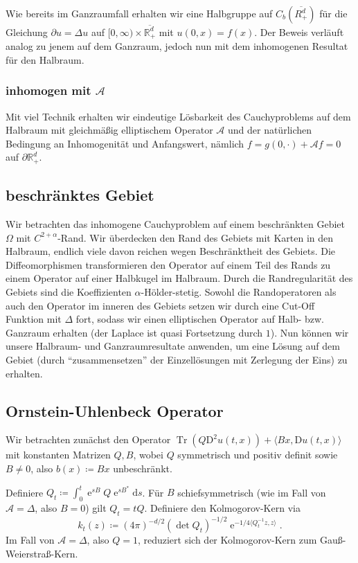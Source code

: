 \documentclass[11pt,a4paper]{scrartcl}
\newcommand{\R}{\mathbb{R}} %
\newcommand{\A}{\mathcal{A}}
\theoremstyle{plain}
\theoremstyle{definition}
\theoremstyle{remark}
\DeclareMathOperator{\Tr}{Tr}
\DeclareMathOperator{\e}{e}
\begin{document}
Wie bereits im Ganzraumfall erhalten wir eine Halbgruppe auf $C_b(\overline{R^d_+})$ für die Gleichung $\partial u = \Delta u$ auf $[0,\infty) \times \overline{\R^d_+}$ mit $u(0,x)=f(x)$. Der Beweis verläuft analog zu jenem auf dem Ganzraum, jedoch nun mit dem inhomogenen Resultat für den Halbraum.

\subsubsection{inhomogen mit $\A$}

Mit viel Technik erhalten wir eindeutige Lösbarkeit des Cauchyproblems auf dem Halbraum mit gleichmäßig elliptischem Operator $\A$ und der natürlichen Bedingung an Inhomogenität und Anfangswert, nämlich $f=g(0,\cdot) + \A f=0$ auf $\partial \R^d_+$.

\subsection{beschränktes Gebiet}

Wir betrachten das inhomogene Cauchyproblem auf einem beschränkten Gebiet $\Omega$ mit $C^{2+\alpha}$-Rand. Wir überdecken den Rand des Gebiets mit Karten in den Halbraum, endlich viele davon reichen wegen Beschränktheit des Gebiets. Die Diffeomorphismen transformieren den Operator auf einem Teil des Rands zu einem Operator auf einer Halbkugel im Halbraum. Durch die Randregularität des Gebiets sind die Koeffizienten $\alpha$-Hölder-stetig. Sowohl die Randoperatoren als auch den Operator im inneren des Gebiets setzen wir durch eine Cut-Off Funktion mit $\Delta$ fort, sodass wir einen elliptischen Operator auf Halb- bzw. Ganzraum erhalten (der Laplace ist quasi Fortsetzung durch $1$). Nun können wir unsere Halbraum- und Ganzraumresultate anwenden, um eine Lösung auf dem Gebiet (durch \enquote{zusammensetzen} der Einzellösungen mit Zerlegung der Eins) zu erhalten.

\subsection{Ornstein-Uhlenbeck Operator}

Wir betrachten zunächst den Operator $\Tr(Q\mathrm{D}^2 u(t,x))+\langle Bx, \mathrm{D}u(t,x)\rangle$ mit konstanten Matrizen $Q,B$, wobei $Q$ symmetrisch und positiv definit sowie $B\neq 0$, also $b(x)\coloneqq Bx$ unbeschränkt.

Definiere $Q_t\coloneqq \int_0^t \e^{sB}Q\e^{sB^*}\mathrm{d}s$. Für $B$ schiefsymmetrisch (wie im Fall von $\A=\Delta$, also $B=0$) gilt $Q_t=tQ$. Definiere den Kolmogorov-Kern via $$k_t(z)\coloneqq (4\pi)^{-d/2}(\det Q_t)^{-1/2} \e^{-1/4\langle Q_t^{-1}z, z\rangle}.$$ Im Fall von $\A=\Delta$, also $Q=1$, reduziert sich der Kolmogorov-Kern zum Gauß-Weierstraß-Kern.
\end{document}
